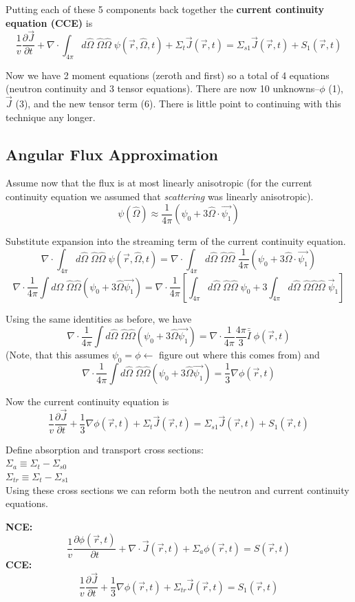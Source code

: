 \documentclass{report}
\newcommand{\hh}[1]{\subsection*{#1}}
\newcommand{\p}{\partial}
\newcommand{\Xs}{\Sigma}
\newcommand{\Oov}{\frac{1}{v}}
\newcommand{\pos}{\vec{r}}
\newcommand{\cur}{\vec{J}}
\newcommand{\Oh}{\hat{\Omega}}
\newcommand{\intfp}{\int_{4\pi}}
\newcommand{\rt}{(\pos,t)}
\newcommand{\rOt}{(\pos,\Oh,t)}
\begin{document}
Putting each of these 5 components back together the \textbf{current continuity equation (CCE)} is
$$\Oov \frac{\p \cur}{\p t} + \nabla \cdot \intfp d\Oh \;\Oh\Oh \; \psi\rOt + \Xs_t \cur\rt = \Xs_{s1}\cur\rt + S_1\rt$$

Now we have 2 moment equations (zeroth and first) so a total of 4 equations (neutron continuity and 3 tensor equations). There are now 10 unknowns–$\phi$ (1), $\cur$ (3), and the new tensor term (6). There is little point to continuing with this technique any longer.


\hh{Angular Flux Approximation}

Assume now that the flux is at most linearly anisotropic (for the current continuity equation we assumed that \textit{scattering} was linearly anisotropic).
$$ \psi(\Oh) \approx \frac{1}{4\pi}\left(\psi_0 + 3\Oh \cdot \vec{\psi_1}\right)$$

Substitute expansion into the streaming term of the current continuity equation.
$$\nabla \cdot \intfp d\Oh \;\Oh\Oh \; \psi\rOt = \nabla \cdot \intfp d\Oh \;\Oh\Oh \; \frac{1}{4\pi}\left(\psi_0 + 3\Oh \cdot \vec{\psi_1}\right)$$
$$ \nabla \cdot \frac{1}{4\pi} \int d\Oh \; \Oh\Oh \left(\psi_0 + 3 \Oh \vec{\psi_1}\right) = \nabla \cdot \frac{1}{4\pi} \left[ \intfp d\Oh \; \Oh\Oh \; \psi_0 + 3 \intfp d\Oh \; \Oh\Oh\Oh \; \vec{\psi}_1 \right] $$

Using the same identities as before, we have
$$ \nabla \cdot \frac{1}{4\pi} \int d\Oh \; \Oh\Oh \left(\psi_0 + 3 \Oh \vec{\psi_1}\right) = \nabla \cdot \frac{1}{4\pi} \frac{4\pi}{3}\bar{\bar{I}} \; \phi\rt $$
(Note, that this assumes $\psi_0 = \phi \leftarrow$ figure out where this comes from)
and
$$ \nabla \cdot \frac{1}{4\pi} \int d\Oh \; \Oh\Oh \left(\psi_0 + 3 \Oh \vec{\psi_1}\right) = \frac{1}{3} \nabla \phi\rt $$

Now the current continuity equation is 
$$\Oov \frac{\p \cur}{\p t} + \frac{1}{3} \nabla \phi\rt + \Xs_t \cur\rt = \Xs_{s1}\cur\rt + S_1\rt$$

Define absorption and transport cross sections:\\
$\Xs_a \equiv \Xs_t - \Xs_{s0}$\\
$\Xs_{tr} \equiv \Xs_t - \Xs_{s1}$\\

Using these cross sections we can reform both the neutron and current continuity equations.

\textbf{NCE:}
$$ \Oov \frac{\p \phi\rt}{\p t} + \nabla \cdot \cur\rt + \Xs_a \phi\rt = S\rt $$
\textbf{CCE:}
$$\Oov \frac{\p \cur}{\p t} + \frac{1}{3} \nabla \phi\rt + \Xs_{tr} \cur\rt = S_1\rt$$
\end{document}
